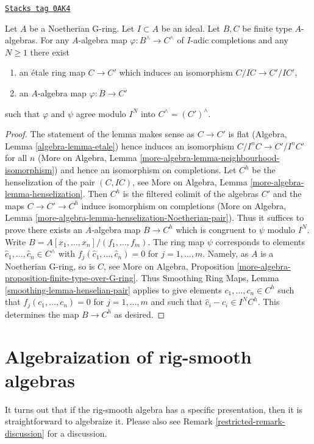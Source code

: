 \begin{lemma}
\label{restricted-lemma-fully-faithfulness}
\href{https://stacks.math.columbia.edu/tag/0AK4}{\texttt{Stacks tag 0AK4}}

Let $A$ be a Noetherian G-ring. Let $I \subset A$ be an ideal.
Let $B, C$ be finite type $A$-algebras. For any $A$-algebra map
$\varphi : B^\wedge \to C^\wedge$ of $I$-adic completions and any
$N \geq 1$ there exist
\begin{enumerate}
\item an \'etale ring map $C \to C'$ which induces
an isomorphism $C/IC \to C'/IC'$,
\item an $A$-algebra map $\varphi : B \to C'$
\end{enumerate}
such that $\varphi$ and $\psi$ agree modulo $I^N$
into $C^\wedge = (C')^\wedge$.
\end{lemma}

\begin{proof}
The statement of the lemma makes sense as $C \to C'$ is flat
(Algebra, Lemma \ref{algebra-lemma-etale}) hence induces an isomorphism
$C/I^nC \to C'/I^nC'$ for all $n$
(More on Algebra, Lemma \ref{more-algebra-lemma-neighbourhood-isomorphism})
and hence an isomorphism on completions.
Let $C^h$ be the henselization of the pair $(C, IC)$, see
More on Algebra, Lemma \ref{more-algebra-lemma-henselization}.
Then $C^h$ is the filtered colimit of the algebras $C'$
and the maps
$C \to C' \to C^h$ induce isomorphism on completions (More on Algebra,
Lemma \ref{more-algebra-lemma-henselization-Noetherian-pair}).
Thus it suffices to prove there exists an $A$-algebra map
$B \to C^h$ which is congruent to $\psi$ modulo $I^N$.
Write $B = A[x_1, \ldots, x_n]/(f_1, \ldots, f_m)$.
The ring map $\psi$ corresponds to elements
$\hat c_1, \ldots, \hat c_n \in C^\wedge$ with
$f_j(\hat c_1, \ldots, \hat c_n) = 0$ for $j = 1, \ldots, m$.
Namely, as $A$ is a Noetherian G-ring, so is $C$, see
More on Algebra, Proposition
\ref{more-algebra-proposition-finite-type-over-G-ring}.
Thus Smoothing Ring Maps,
Lemma \ref{smoothing-lemma-henselian-pair}
applies to give elements $c_1, \ldots, c_n \in C^h$ such
that $f_j(c_1, \ldots, c_n) = 0$ for $j = 1, \ldots, m$
and such that $\hat c_i - c_i \in I^NC^h$.
This determines the map $B \to C^h$ as desired.
\end{proof}

\section{Algebraization of rig-smooth algebras}
\label{restricted-section-algebraization-rig-smooth}
It turns out that if the rig-smooth algebra has a specific presentation,
then it is straightforward to algebraize it. Please also see
Remark \ref{restricted-remark-discussion} for a discussion.

